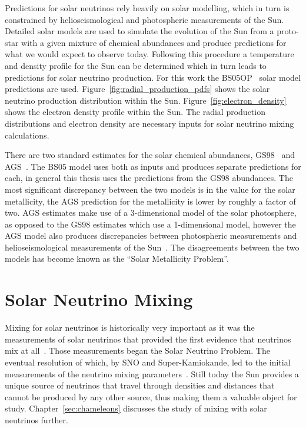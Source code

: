 Predictions for solar neutrinos rely heavily on solar modelling, which in turn
is constrained by helioseismological and photospheric measurements of the Sun.
Detailed solar models are used to simulate the evolution of the Sun from a proto-star
with a given mixture of chemical abundances and produce predictions for
what we would expect to observe today.
Following this procedure a temperature and density profile for the Sun can be determined
which in turn leads to predictions for solar neutrino production.
For this work the BS05OP~\citep{bs_ssm} solar model predictions are used.
Figure~\ref{fig:radial_production_pdfs} shows the solar neutrino production
distribution within the Sun.
Figure~\ref{fig:electron_density} shows the electron density profile within
the Sun.
The radial production distributions and electron density are necessary inputs
for solar neutrino mixing calculations.

There are two standard estimates for the solar chemical abundances,
GS98~\citep{gs98} and AGS~\citep{ags}.
The BS05 model uses both as inputs and produces separate predictions for each,
in general this thesis uses the predictions from the GS98 abundances.
The most significant discrepancy between the two models is in the value
for the solar metallicity, the AGS prediction for the metallicity is
lower by roughly a factor of two.
AGS estimates make use of a 3-dimensional model of the solar photosphere,
as opposed to the GS98 estimates which use a 1-dimensional model, however
the AGS model also produces discrepancies between photospheric measurements
and helioseismological measurements of the Sun~\citep{ags, bahcall_ssm}.
The disagreements between the two models has become known as the
``Solar Metallicity Problem''.


\section{Solar Neutrino Mixing}
\label{sec:solar_nu_mixing}
Mixing for solar neutrinos is historically very important as it was
the measurements of solar neutrinos that provided the first evidence that
neutrinos mix at all~\citep{homestake,solar_nu_problem}.
Those measurements began the Solar Neutrino Problem.
The eventual resolution of which, by SNO and Super-Kamiokande,
led to the initial measurements of the neutrino mixing parameters~\citep{superk_atmospherics,
sno_second}.
Still today the Sun provides a unique source of neutrinos that travel through
densities and distances that cannot be produced by any other source, thus making
them a valuable object for study.
Chapter~\ref{sec:chameleons} discusses the study of mixing with
solar neutrinos further.

